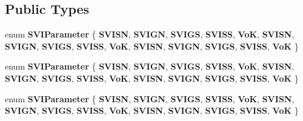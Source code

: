 \subsection*{Public Types}
\begin{DoxyCompactItemize}
\item 
\mbox{\label{class_sludge_volume_index_a5ebdfd6b0b5eb39d579f7055f71bf33a}} 
enum {\bfseries S\+V\+I\+Parameter} \{ \newline
{\bfseries S\+V\+I\+SN}, 
{\bfseries S\+V\+I\+GN}, 
{\bfseries S\+V\+I\+GS}, 
{\bfseries S\+V\+I\+SS}, 
\newline
{\bfseries VoK}, 
{\bfseries S\+V\+I\+SN}, 
{\bfseries S\+V\+I\+GN}, 
{\bfseries S\+V\+I\+GS}, 
\newline
{\bfseries S\+V\+I\+SS}, 
{\bfseries VoK}, 
{\bfseries S\+V\+I\+SN}, 
{\bfseries S\+V\+I\+GN}, 
\newline
{\bfseries S\+V\+I\+GS}, 
{\bfseries S\+V\+I\+SS}, 
{\bfseries VoK}
 \}
\item 
\mbox{\label{class_sludge_volume_index_a5ebdfd6b0b5eb39d579f7055f71bf33a}} 
enum {\bfseries S\+V\+I\+Parameter} \{ \newline
{\bfseries S\+V\+I\+SN}, 
{\bfseries S\+V\+I\+GN}, 
{\bfseries S\+V\+I\+GS}, 
{\bfseries S\+V\+I\+SS}, 
\newline
{\bfseries VoK}, 
{\bfseries S\+V\+I\+SN}, 
{\bfseries S\+V\+I\+GN}, 
{\bfseries S\+V\+I\+GS}, 
\newline
{\bfseries S\+V\+I\+SS}, 
{\bfseries VoK}, 
{\bfseries S\+V\+I\+SN}, 
{\bfseries S\+V\+I\+GN}, 
\newline
{\bfseries S\+V\+I\+GS}, 
{\bfseries S\+V\+I\+SS}, 
{\bfseries VoK}
 \}
\item 
\mbox{\label{class_sludge_volume_index_a5ebdfd6b0b5eb39d579f7055f71bf33a}} 
enum {\bfseries S\+V\+I\+Parameter} \{ \newline
{\bfseries S\+V\+I\+SN}, 
{\bfseries S\+V\+I\+GN}, 
{\bfseries S\+V\+I\+GS}, 
{\bfseries S\+V\+I\+SS}, 
\newline
{\bfseries VoK}, 
{\bfseries S\+V\+I\+SN}, 
{\bfseries S\+V\+I\+GN}, 
{\bfseries S\+V\+I\+GS}, 
\newline
{\bfseries S\+V\+I\+SS}, 
{\bfseries VoK}, 
{\bfseries S\+V\+I\+SN}, 
{\bfseries S\+V\+I\+GN}, 
\newline
{\bfseries S\+V\+I\+GS}, 
{\bfseries S\+V\+I\+SS}, 
{\bfseries VoK}
 \}
\end{DoxyCompactItemize}
